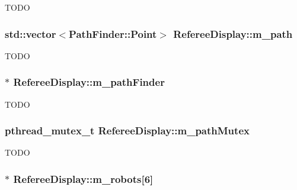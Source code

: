 \label{classRefereeDisplay_a07fda892af04771c6484160fb0e5585f}
TODO \hypertarget{classRefereeDisplay_a582b6bcc0204a2876b629e8ceebc8abd}{
\subsubsection[{m\_\-path}]{\setlength{\rightskip}{0pt plus 5cm}std::vector$<${\bf PathFinder::Point}$>$ {\bf RefereeDisplay::m\_\-path}}}
\label{classRefereeDisplay_a582b6bcc0204a2876b629e8ceebc8abd}
TODO \hypertarget{classRefereeDisplay_a0ccee8231a72e1a906dff856e072d5a0}{
\subsubsection[{m\_\-pathFinder}]{$\ast$ {\bf RefereeDisplay::m\_\-pathFinder}}}
\label{classRefereeDisplay_a0ccee8231a72e1a906dff856e072d5a0}
TODO \hypertarget{classRefereeDisplay_a2ec44bb3c993cb8e518a730153116da7}{
\subsubsection[{m\_\-pathMutex}]{\setlength{\rightskip}{0pt plus 5cm}pthread\_\-mutex\_\-t {\bf RefereeDisplay::m\_\-pathMutex}}}
\label{classRefereeDisplay_a2ec44bb3c993cb8e518a730153116da7}
TODO \hypertarget{classRefereeDisplay_a4a777a38327f96fe1e5c9051b6c3c38f}{
\subsubsection[{m\_\-robots}]{$\ast$ {\bf RefereeDisplay::m\_\-robots}\mbox{[}6\mbox{]}}}
